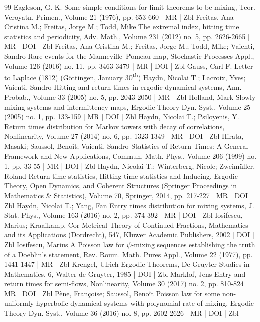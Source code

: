 \documentclass[10pt]{amsart}
\theoremstyle{definition}\newtheorem{defi}[theo]{Definition}\newtheorem{rema}[theo]{Remark}\newtheorem{exam}[theo]{Example}\newtheorem{exem}[theo]{Example}\newtheorem{nota}[theo]{Notation}
\begin{document}
\begin{thebibliography}{99}
Eagleson, G. K. Some simple conditions for limit theorems to be mixing, Teor. Veroyatn. Primen., Volume 21 (1976), pp. 653-660 | MR | Zbl
Freitas, Ana Cristina M.; Freitas, Jorge M.; Todd, Mike The extremal index, hitting time statistics and periodicity, Adv. Math., Volume 231 (2012) no. 5, pp. 2626-2665 | MR | DOI | Zbl
Freitas, Ana Cristina M.; Freitas, Jorge M.; Todd, Mike; Vaienti, Sandro Rare events for the Manneville–Pomeau map, Stochastic Processes Appl., Volume 126 (2016) no. 11, pp. 3463-3479 | MR | DOI | Zbl
Gauss, Carl F. Letter to Laplace (1812) (Göttingen, January 30\textsuperscript{th})
Haydn, Nicolai T.; Lacroix, Yves; Vaienti, Sandro Hitting and return times in ergodic dynamical systems, Ann. Probab., Volume 33 (2005) no. 5, pp. 2043-2050 | MR | Zbl
Holland, Mark Slowly mixing systems and intermittency maps, Ergodic Theory Dyn. Syst., Volume 25 (2005) no. 1, pp. 133-159 | MR | DOI | Zbl
Haydn, Nicolai T.; Psiloyenis, Y. Return times distribution for Markov towers with decay of correlations, Nonlinearity, Volume 27 (2014) no. 6, pp. 1323-1349 | MR | DOI | Zbl
Hirata, Masaki; Saussol, Benoît; Vaienti, Sandro Statistics of Return Times: A General Framework and New Applications, Commun. Math. Phys., Volume 206 (1999) no. 1, pp. 33-55 | MR | DOI | Zbl
Haydn, Nicolai T.; Winterberg, Nicole; Zweimüller, Roland Return-time statistics, Hitting-time statistics and Inducing, Ergodic Theory, Open Dynamics, and Coherent Structures (Springer Proceedings in Mathematics \& Statistics), Volume 70, Springer, 2014, pp. 217-227 | MR | DOI | Zbl
Haydn, Nicolai T.; Yang, Fan Entry times distribution for mixing systems, J. Stat. Phys., Volume 163 (2016) no. 2, pp. 374-392 | MR | DOI | Zbl
Iosifescu, Marius; Kraaikamp, Cor Metrical Theory of Continued Fractions, Mathematics and its Applications (Dordrecht), 547, Kluwer Academic Publishers, 2002 | DOI | Zbl
Iosifescu, Marius A Poisson law for $\psi $-mixing sequences establishing the truth of a Doeblin’s statement, Rev. Roum. Math. Pures Appl., Volume 22 (1977), pp. 1441-1447 | MR | Zbl
Krengel, Ulrich Ergodic Theorems, De Gruyter Studies in Mathematics, 6, Walter de Gruyter, 1985 | DOI | Zbl
Marklof, Jens Entry and return times for semi-flows, Nonlinearity, Volume 30 (2017) no. 2, pp. 810-824 | MR | DOI | Zbl
Pène, Françoise; Saussol, Benoît Poisson law for some non-uniformly hyperbolic dynamical systems with polynomial rate of mixing, Ergodic Theory Dyn. Syst., Volume 36 (2016) no. 8, pp. 2602-2626 | MR | DOI | Zbl

\end{thebibliography}
\end{document}
